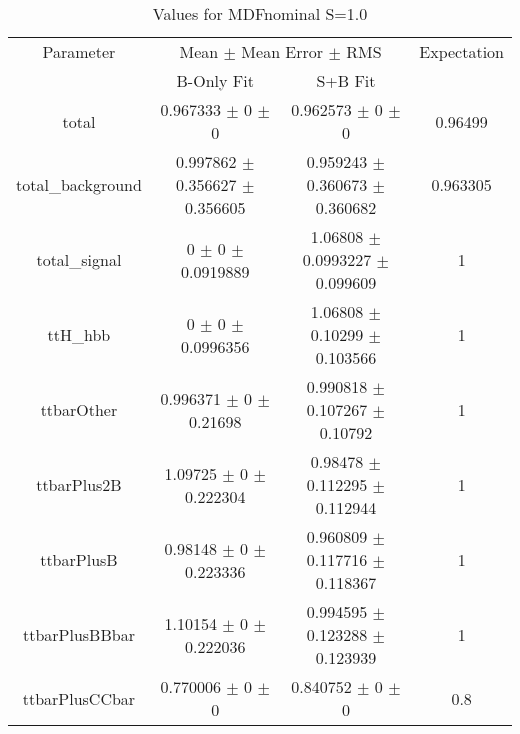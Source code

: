 \begin{table}
\centering
\caption{Values for MDFnominal S=1.0}
\begin{tabular}{cccc}
\toprule
Parameter & \multicolumn{2}{c}{Mean $\pm$ Mean Error $\pm$ RMS} & Expectation\\
 & B-Only Fit & S+B Fit & \\
\midrule
total & \num{0.967333} $\pm$ \num{0} $\pm$ \num{0} & \num{0.962573} $\pm$ \num{0} $\pm$ \num{0} & \num{0.96499}\\
total\_background & \num{0.997862} $\pm$ \num{0.356627} $\pm$ \num{0.356605} & \num{0.959243} $\pm$ \num{0.360673} $\pm$ \num{0.360682} & \num{0.963305}\\
total\_signal & \num{0} $\pm$ \num{0} $\pm$ \num{0.0919889} & \num{1.06808} $\pm$ \num{0.0993227} $\pm$ \num{0.099609} & \num{1}\\
ttH\_hbb & \num{0} $\pm$ \num{0} $\pm$ \num{0.0996356} & \num{1.06808} $\pm$ \num{0.10299} $\pm$ \num{0.103566} & \num{1}\\
ttbarOther & \num{0.996371} $\pm$ \num{0} $\pm$ \num{0.21698} & \num{0.990818} $\pm$ \num{0.107267} $\pm$ \num{0.10792} & \num{1}\\
ttbarPlus2B & \num{1.09725} $\pm$ \num{0} $\pm$ \num{0.222304} & \num{0.98478} $\pm$ \num{0.112295} $\pm$ \num{0.112944} & \num{1}\\
ttbarPlusB & \num{0.98148} $\pm$ \num{0} $\pm$ \num{0.223336} & \num{0.960809} $\pm$ \num{0.117716} $\pm$ \num{0.118367} & \num{1}\\
ttbarPlusBBbar & \num{1.10154} $\pm$ \num{0} $\pm$ \num{0.222036} & \num{0.994595} $\pm$ \num{0.123288} $\pm$ \num{0.123939} & \num{1}\\
ttbarPlusCCbar & \num{0.770006} $\pm$ \num{0} $\pm$ \num{0} & \num{0.840752} $\pm$ \num{0} $\pm$ \num{0} & \num{0.8}\\
\bottomrule
\end{tabular}
\end{table}